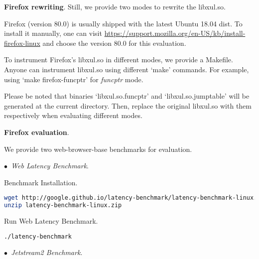 \documentclass{sigplanconf}
\begin{document}
{%

\vspace{2pt}\noindent\textbf{Firefox rewriting}. 
Still, we provide two modes to rewrite the libxul.so.

Firefox (version 80.0) is usually shipped with the latest Ubuntu 18.04 dist. 
To install it manually, one can visit \url{https://support.mozilla.org/en-US/kb/install-firefox-linux} and choose the version 80.0 for this evaluation.


To instrument Firefox’s libxul.so in different modes, we provide a Makefile.
Anyone can instrument libxul.so using different `make' commands. 
For example, using `make firefox-funcptr' for \textit{funcptr} mode. 


Please be noted that binaries `libxul.so.funcptr' and `libxul.so.jumptable' will be generated at the current directory. 
Then, replace the original libxul.so with them respectively when evaluating different modes.


\vspace{2pt}\noindent\textbf{Firefox evaluation}.

We provide two web-browser-base benchmarks for evaluation.

\vspace{1pt}\noindent$\bullet$\textit{~Web Latency Benchmark}.

Benchmark Installation.

\begin{lstlisting}[language=bash]
wget http://google.github.io/latency-benchmark/latency-benchmark-linux.zip
unzip latency-benchmark-linux.zip
\end{lstlisting}

Run Web Latency Benchmark.

\begin{lstlisting}[language=bash]
./latency-benchmark
\end{lstlisting}

\vspace{1pt}\noindent$\bullet$\textit{~Jetstream2 Benchmark}.

}
\end{document}
